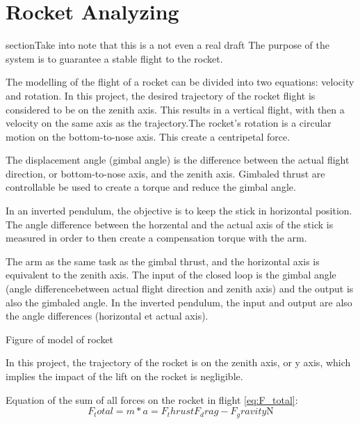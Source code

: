 \chapter{Rocket Analyzing}

section{Take into note that this is a not even a real draft}
The purpose of the system is to guarantee a stable flight to the rocket.

The modelling of the flight of a rocket can be divided into two equations: velocity and rotation. In this project, the desired trajectory of the rocket flight is considered to be on the zenith axis. This results in a vertical flight, with then a velocity on the same axis as the trajectory.The rocket's rotation is a circular motion on the bottom-to-nose axis. This create a centripetal force.

The displacement angle (gimbal angle) is the difference between the actual flight direction, or bottom-to-nose axis, and the zenith axis. Gimbaled thrust are controllable be used to create a torque and reduce the gimbal angle. 

In an inverted pendulum, the objective is to keep the stick in horizontal position. The angle difference between the horzental and the actual axis of the stick is measured in order to then create a compensation torque with the arm.

The arm as the same task as the gimbal thrust, and the horizontal axis is equivalent to the zenith axis.
The input of the closed loop is the gimbal angle (angle differencebetween actual flight direction and zenith axis) and the output is also the gimbaled angle. In the inverted pendulum, the input and output are also the angle differences (horizontal et actual axis). 



Figure of model of rocket

In this project, the trajectory of the rocket is on the zenith axis, or y axis, which implies the impact of the lift on the rocket is negligible.

Equation of the sum of all forces on the rocket in flight \eqref{eq:F_total}:
\begin{equation}
F_total = m*a = F_thrust  F_drag - F_gravity \si{\newton} \label{eq:F_total}
\end{equation}
\startexplain
{}
\stopexplain

